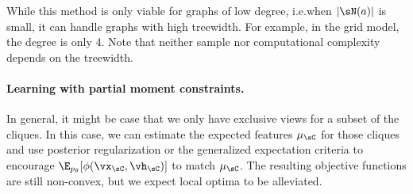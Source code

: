 
While this method is only viable for graphs of low degree, i.e.\@ when $|\sN(a)|$ is small,
it can handle graphs with high treewidth.
For example, in the grid model, the degree is only 4.
Note that neither sample nor computational complexity depends on the treewidth.

\paragraph{Learning with partial moment constraints.}

In general, it might be case that we only have exclusive views for a subset of the cliques.
In this case, we can estimate the expected features $\mu_\sC$ for those cliques
  and use posterior regularization \citep{graca08em} or the generalized expectation criteria \citep{mann08ge}
  to encourage $\E_{p_\theta}[\phi(\vx_\sC,\vh_\sC)]$ to match $\mu_\sC$.
The resulting objective functions are still non-convex, but we expect
  local optima to be alleviated. 



